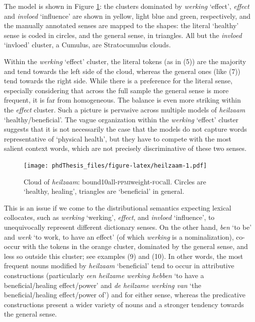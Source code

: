 \documentclass[
]{book}
\begin{document}
The model is shown in Figure \ref{fig:heilzaam}: the clusters dominated by \emph{werking} `effect', \emph{effect} and \emph{invloed} `influence' are shown in yellow, light blue and green, respectively, and the manually annotated senses are mapped to the shapes: the literal `healthy' sense is coded in circles, and the general sense, in triangles. All but the \emph{invloed} `invloed' cluster, a Cumulus, are Stratocumulus clouds.

Within the \emph{werking} `effect' cluster, the literal tokens (as in (5)) are the majority and tend towards the left side of the cloud, whereas the general ones (like (7)) tend towards the right side. While there is a preference for the literal sense, especially considering that across the full sample the general sense is more frequent, it is far from homogeneous. The balance is even more striking within the \emph{effect} cluster.
Such a picture is pervasive across multiple models of \emph{heilzaam} `healthy/beneficial'. The vague organization within the \emph{werking} `effect' cluster suggests that it is not necessarily the case that the models do not capture words representative of `physical health', but they have to compete with the most salient context words, which are not precisely discriminative of these two senses.



\begin{figure}
\centering
\texttt{[image: phdThesis\_files/figure-latex/heilzaam-1.pdf]}
\caption{\label{fig:heilzaam}Cloud of \emph{heilzaam}: bound10all-\textsc{ppmi}weight-\textsc{foc}all. Circles are `healthy, healing', triangles are `beneficial' in general.}
\end{figure}

This is an issue if we come to the distributional semantics expecting lexical collocates, such as \emph{werking} `werking', \emph{effect}, and \emph{invloed} `influence', to unequivocally represent different dictionary senses. On the other hand, \emph{ben} `to be' and \emph{werk} `to work, to have an effect' (of which \emph{werking} is a nominalization), co-occur with the tokens in the orange cluster, dominated by the general sense, and less so outside this cluster; see examples (9) and (10).
In other words, the most frequent nouns modified by \emph{heilzaam} `beneficial' tend to occur in attributive constructions (particularly \emph{een heilzame werking hebben} `to have a beneficial/healing effect/power' and \emph{de heilzame werking van} `the beneficial/healing effect/power of') and for either sense, whereas the predicative constructions present a wider variety of nouns and a stronger tendency towards the general sense.
\end{document}

